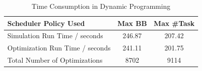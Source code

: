 
\begin{table}[!t] 
        \renewcommand{\arraystretch}{1.3}
        \caption{Time Consumption in Dynamic Programming}
        \label{Tab:OptimizationTime}
        \centering
        \begin{tabular}{l|c|c}
                \hline
                Scheduler Policy Used & Max BB & Max \#Task \\
                \hline
                \hline
                Simulation Run Time / seconds & 246.87 & 207.42 \\
                Optimization Run Time / seconds & 241.11 & 201.75 \\
                Total Number of Optimizations & 8702 & 9114 \\
                \hline
        \end{tabular}
\end{table}


